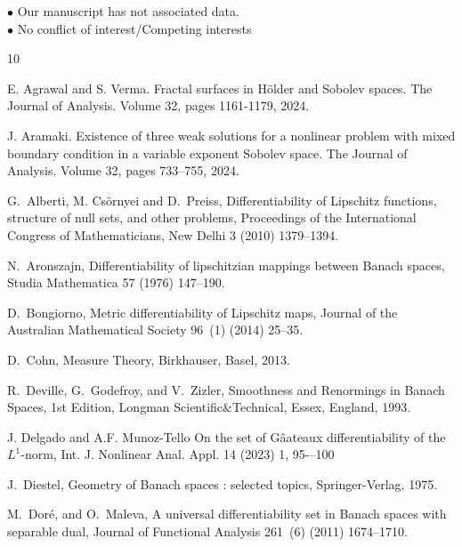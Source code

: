 \documentclass[a4paper,12pt,reqno]{amsart}%
\theoremstyle{definition}
\numberwithin{equation}{section}
\numberwithin{theorem}{section}
\begin{document}
\noindent $\bullet$ Our manuscript has not associated data.\\


\noindent $\bullet$ No conflict of interest/Competing interests 



%

\begin{thebibliography}{10}

 E. Agrawal and S. Verma. Fractal surfaces in Hölder and Sobolev spaces. The Journal of Analysis.  Volume 32, pages 1161-1179, 2024.

 J. Aramaki. Existence of three weak solutions for a nonlinear problem with mixed boundary condition in a variable exponent Sobolev space. The Journal of Analysis. Volume 32, pages 733–755, 2024.

G.~Alberti, M. Cs\"ornyei and D.~Preiss, Differentiability of {L}ipschitz functions,
  structure of null sets, and other problems, Proceedings of the International
  Congress of Mathematicians, New Delhi 3 (2010)  1379--1394.

N.~Aronszajn, Differentiability of lipschitzian mappings between {B}anach
  spaces, Studia Mathematica 57 (1976) 147--190.

D.~Bongiorno, {Metric differentiability of Lipschitz maps}, Journal of the
  Australian Mathematical Society 96~(1) (2014) 25--35.

D.~Cohn, {Measure Theory}, Birkhauser, Basel, 2013.

R.~Deville, G.~Godefroy, and V.~Zizler, {Smoothness and Renormings in Banach
  Spaces}, 1st Edition, Longman Scientific{\&}Technical, Essex, England, 1993.


 J. Delgado and A.F. Munoz-Tello {On the set of G\^aateaux differentiability of the $L^1$-norm}, Int. J. Nonlinear Anal. Appl. 14 (2023) 1, 95-–100

J.~Diestel, {Geometry of Banach spaces : selected topics}, Springer-Verlag,
  1975.

M.~Dor{\'{e}}, and O.~Maleva, {A universal differentiability set in Banach
  spaces with separable dual}, Journal of Functional Analysis 261~(6) (2011)
  1674--1710.


\end{thebibliography}
\end{document}
